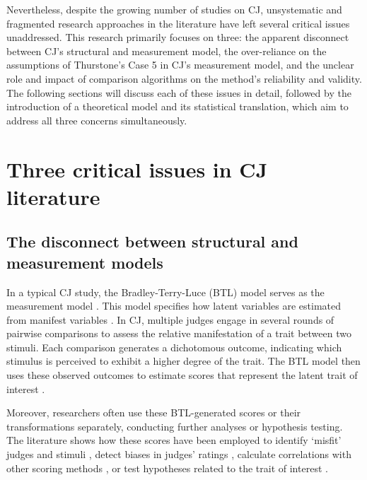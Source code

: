 \documentclass[
  authoryear,
  preprint,
  1p]{elsarticle}
\begin{document}
Nevertheless, despite the growing number of studies on CJ, unsystematic
and fragmented research approaches in the literature have left several
critical issues unaddressed. This research primarily focuses on three:
the apparent disconnect between CJ's structural and measurement model,
the over-reliance on the assumptions of Thurstone's Case 5
\citeyearpar{Thurstone_1927} in CJ's measurement model, and the unclear
role and impact of comparison algorithms on the method's reliability and
validity. The following sections will discuss each of these issues in
detail, followed by the introduction of a theoretical model and its
statistical translation, which aim to address all three concerns
simultaneously.

\section{Three critical issues in CJ
literature}\label{sec-theory-issues}

\subsection{The disconnect between structural and measurement
models}\label{the-disconnect-between-structural-and-measurement-models}

In a typical CJ study, the Bradley-Terry-Luce (BTL) model
\citep{Bradley_et_al_1952, Luce_1959} serves as the measurement model
\citep{Andrich_1978, Bramley_2008}. This model specifies how latent
variables are estimated from manifest variables
\citep{Everitt_et_al_2010}. In CJ, multiple judges engage in several
rounds of pairwise comparisons to assess the relative manifestation of a
trait between two stimuli. Each comparison generates a dichotomous
outcome, indicating which stimulus is perceived to exhibit a higher
degree of the trait. The BTL model then uses these observed outcomes to
estimate scores that represent the latent trait of interest
\citep{Pollitt_2012a, Pollitt_2012b, Whitehouse_2012, Jones_2015, vanDaal_et_al_2016, Lesterhuis_2018, Boonen_et_al_2020, Bouwer_et_al_2023}.

Moreover, researchers often use these BTL-generated scores or their
transformations separately, conducting further analyses or hypothesis
testing. The literature shows how these scores have been employed to
identify `misfit' judges and stimuli
\citep{Pollitt_2012b, vanDaal_et_al_2017, Goossens_et_al_2018}, detect
biases in judges' ratings \citep{Pollitt_et_al_2003, Pollitt_2012b},
calculate correlations with other scoring methods
\citep{Goossens_et_al_2018, Bouwer_et_al_2023}, or test hypotheses
related to the trait of interest
\citep{Bramley_et_al_2019, Boonen_et_al_2020, Bouwer_et_al_2023, vanDaal_et_al_2017, Jones_et_al_2019, Gijsen_et_al_2021}.
\end{document}

